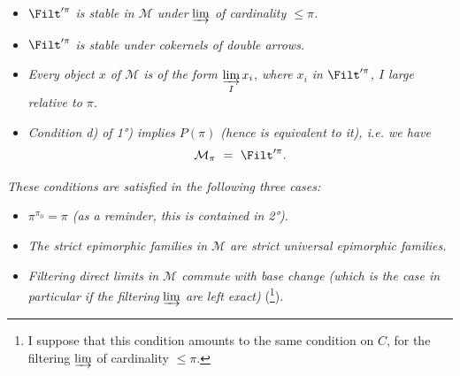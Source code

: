\setcounter{footnote}{49}


\begin{itemize}
\item[\textit{1)}] $\Filt'^{\pi}$ \textit{is stable in $\mathcal{M}$ under} $\varinjlim$ \textit{of cardinality $\leqslant \pi$.}
\item[\textit{1$'$)}] $\Filt'^{\pi}$ \textit{is stable under cokernels of double arrows.}
\item[\textit{2)}] \textit{Every object $x$ of $\mathcal{M}$ is of the form $\varinjlim\limits_{I} x_i$, where $x_i$ in} $\Filt'^{\pi}$\textit{, $I$ large relative to $\pi$.}
\item[\textit{3)}] \textit{Condition d) of 1°) implies $P(\pi)$ (hence is equivalent to it), i.e. we have}
\[ \mathcal{M}_{\pi} \ = \ \Filt'^{\pi}. \]
\end{itemize}

\textit{These conditions are satisfied in the following three cases:}
\begin{itemize}
\item[\textit{A)}] \textit{$\pi^{\pi_0} = \pi$ (as a reminder, this is contained in 2°).}
\item[\textit{B)}] \textit{The strict epimorphic families in $\mathcal{M}$ are strict universal epimorphic families.}
\item[\textit{C)}] \textit{Filtering direct limits in $\mathcal{M}$ commute with base change (which is the case in particular if the filtering} $\varinjlim$ \textit{are left exact)} (\footnote{I suppose that this condition amounts to the same condition on $C$, for the filtering $\varinjlim$ of cardinality $\leqslant \pi$.}).
\end{itemize}

